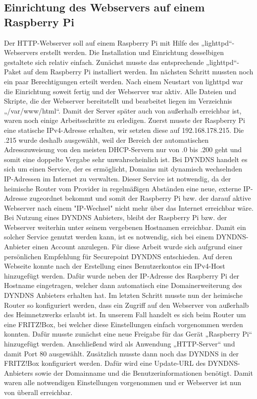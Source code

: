 \subsection{Einrichtung des Webservers auf einem Raspberry Pi}
Der HTTP-Webserver soll auf einem Raspberry Pi mit Hilfe des „lighttpd“-Webservers erstellt werden. Die Installation und Einrichtung desselbigen gestaltete sich relativ einfach. Zunächst musste das entsprechende „lighttpd“-Paket auf dem Raspberry Pi installiert werden. Im nächsten Schritt mussten noch ein paar Berechtigungen erteilt werden. Nach einem Neustart von lighttpd war die Einrichtung soweit fertig und der Webserver war aktiv. Alle Dateien und Skripte, die der Webserver bereitstellt und bearbeitet liegen im Verzeichnis „/var/www/html“.
Damit der Server später auch von außerhalb erreichbar ist, waren noch einige Arbeitsschritte zu erledigen. Zuerst musste der Raspberry Pi eine statische IPv4-Adresse erhalten, wir setzten diese auf 192.168.178.215. Die .215 wurde deshalb ausgewählt, weil der Bereich der automatischen Adresszuweisung von den meisten DHCP-Servern nur von .0 bis .200 geht und somit eine doppelte Vergabe sehr unwahrscheinlich ist.
Bei DYNDNS handelt es sich um einen Service, der es ermöglicht, Domains mit dynamisch wechselnden IP-Adressen im Internet zu verwalten. Dieser Service ist notwendig, da der heimische Router vom Provider in regelmäßigen Abständen eine neue, externe IP-Adresse zugeordnet bekommt und somit der Raspberry Pi bzw. der darauf aktive Webserver nach einem "IP-Wechsel" nicht mehr über das Internet erreichbar wäre. Bei Nutzung eines DYNDNS Anbieters, bleibt der Raspberry Pi bzw. der Webserver weiterhin unter seinem vergebenen Hostnamen erreichbar. Damit ein solcher Service genutzt werden kann, ist es notwendig, sich bei einem DYNDNS-Anbieter einen Account anzulegen. Für diese Arbeit wurde sich aufgrund einer persönlichen Empfehlung für Securepoint DYNDNS entschieden. Auf deren Webseite konnte nach der Erstellung eines Benutzerkontos ein IPv4-Host hinzugefügt werden. Dafür wurde neben der IP-Adresse des Raspberry Pi der Hostname eingetragen, welcher dann automatisch eine Domainerweiterung des DYNDNS Anbieters erhalten hat.
Im letzten Schritt musste nun der heimische Router so konfiguriert werden, dass ein Zugriff auf den Webserver von außerhalb des Heimnetzwerks erlaubt ist. In unserem Fall handelt es sich beim Router um eine FRITZ!Box, bei welcher diese Einstellungen einfach vorgenommen werden konnten.  Dafür musste zunächst eine neue Freigabe für das Gerät „Raspberry Pi“ hinzugefügt werden. Anschließend wird als Anwendung „HTTP-Server“ und damit Port 80 ausgewählt. Zusätzlich musste dann noch das DYNDNS in der FRITZ!Box konfiguriert werden. Dafür wird eine Update-URL des DYNDNS-Anbieters sowie der Domainname und die Benutzerinformationen benötigt. Damit waren alle notwendigen Einstellungen vorgenommen und er Webserver ist nun von überall erreichbar.
